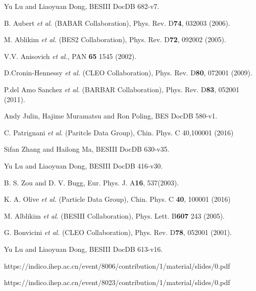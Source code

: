\newpage
\begin{thebibliography}{99}

Yu Lu and Liaoyuan Dong, 
BESIII DocDB 682-v7.

B. Aubert {\it et al.}  (BABAR Collaboration),
Phys. Rev. D\textbf{74}, 032003 (2006).

M. Ablikim {\it et al.}  (BES2 Collaboration),
Phys. Rev. D\textbf{72}, 092002 (2005).

V.V. Anisovich {\it et al.},
PAN \textbf{65} 1545 (2002).

D.Cronin-Hennessy {\it et al.}  (CLEO Collaboration),
Phys. Rev. D\textbf{80}, 072001 (2009).

P.del Amo Sanchez {\it et al.}  (BARBAR Collaboration),
Phys. Rev. D\textbf{83}, 052001 (2011).

Andy Julin, Hajime Muramatsu and Ron Poling,  
BES\uppercase\expandafter{} DocDB 580-v1.

C. Patrignani {\it et al.}  (Paritcle Data Group),
Chin. Phys. C 40,100001 (2016)

Sifan Zhang and Hailong Ma, 
BESIII DocDB 630-v35.

Yu Lu and Liaoyuan Dong, 
BESIII DocDB 416-v30.

B. S. Zou and D. V. Bugg, 
Eur. Phys. J. A\textbf{16}, 537(2003).

K. A. Olive {\it et al.} (Particle Data Group), 
Chin. Phys. C \textbf{40}, 100001 (2016)

M. Alblikim {\it et al.}  (BESIII Collaboration),
Phys. Lett. B\textbf{607} 243 (2005).

G. Bonvicini {\it et al.}  (CLEO Collaboration),
Phys. Rev. D\textbf{78}, 052001 (2001).

Yu Lu and Liaoyuan Dong, 
BESIII DocDB 613-v16.

https://indico.ihep.ac.cn/event/8006/contribution/1/material/slides/0.pdf

https://indico.ihep.ac.cn/event/8023/contribution/1/material/slides/0.pdf

\end{thebibliography}

